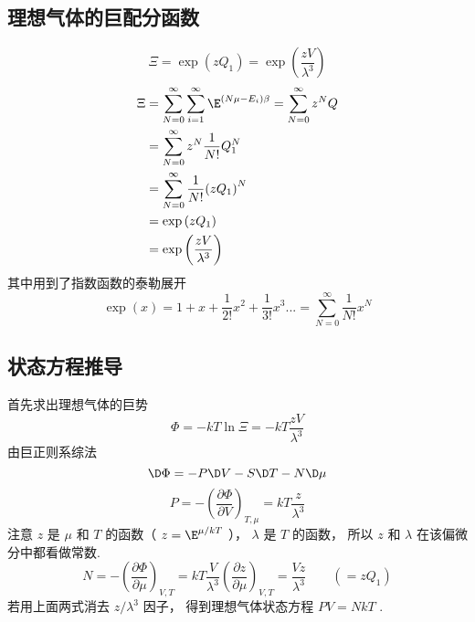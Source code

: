 
\subsection{理想气体的巨配分函数}
\noindent{}
  \begin{equation}\label{IdMCE_eq1}
    \Xi  = \exp \left( {z{Q_1}} \right) = \exp \left( {\frac{{zV}}{{{\lambda ^3}}}} \right)
  \end{equation}
  \begin{equation}\label{IdMCE_eq2}
    \begin{aligned}
\Xi & = \sum\limits_{N = 0}^\infty  {\sum\limits_{i = 1}^\infty  {{\E^{\left( {N\mu  - {E_i}} \right)\beta }}} }  = \sum\limits_{N = 0}^\infty  {{z^N}Q} \\
 & = \sum\limits_{N = 0}^\infty  {{z^N}\frac{1}{{N!}}Q_1^N} \\
 & = \sum\limits_{N = 0}^\infty  {\frac{1}{{N!}}{{\left( {z{Q_1}} \right)}^N}} \\
 & = \exp \left( {z{Q_1}} \right) \\
 & = \exp \left( {\frac{{zV}}{{{\lambda ^3}}}} \right){\kern 1pt} {\kern 1pt} {\kern 1pt} {\kern 1pt} {\kern 1pt} {\kern 1pt} {\kern 1pt}
\end{aligned}
  \end{equation}
  其中用到了指数函数的泰勒展开%
  \begin{equation}\label{IdMCE_eq3}
  \exp \left( x \right) = 1 + x + \frac{1}{{2!}}{x^2} + \frac{1}{{3!}}{x^3}... = \sum\limits_{N = 0}^\infty  {\frac{1}{{N!}}{x^N}}
  \end{equation}

\subsection{状态方程推导}
  首先求出理想气体的巨势
  \begin{equation}\label{IdMCE_eq4}
    \Phi  =  - kT\ln \Xi  =  - kT\frac{{zV}}{{{\lambda ^3}}}
  \end{equation}
  由巨正则系综法%
  \begin{equation}\label{IdMCE_eq5}
    \D \Phi  =  - P \D V - S \D T - N \D \mu
  \end{equation}
  \begin{equation}\label{IdMCE_eq6}
    P =  - {\left( {\frac{{\partial \Phi }}{{\partial V}}} \right)_{T,\mu }} = kT\frac{z}{{{\lambda ^3}}}
  \end{equation}
  注意 $z$ 是 $\mu $ 和 $T$ 的函数（ $z = {\E^{{\mu }/{{kT}}}}$ ）， $\lambda $ 是 $T$ 的函数， 所以 $z$ 和 $\lambda $ 在该偏微分中都看做常数.
  \begin{equation}\label{IdMCE_eq7}
  N =  - {\left( {\frac{{\partial \Phi }}{{\partial \mu }}} \right)_{V,T}} = kT\frac{V}{{{\lambda ^3}}}{\left( {\frac{{\partial z}}{{\partial \mu }}} \right)_{V,T}} = \frac{{Vz}}{{{\lambda ^3}}} 
  \qquad
  ( = z{Q_1})
  \end{equation}
若用上面两式消去 ${z}/{{{\lambda ^3}}}$ 因子， 得到理想气体状态方程 $PV = NkT$ .
  

